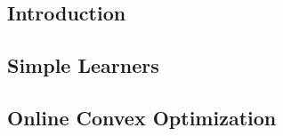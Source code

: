 

\subsection{Introduction}


\subsection{Simple Learners}


\subsection{Online Convex Optimization}

 
